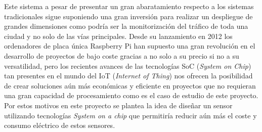 \documentclass[../proyecto.tex]{subfiles}
\begin{document}
Este sistema a pesar de presentar un gran abaratamiento respecto a los sistemas tradicionales sigue suponiendo una gran inversión para realizar un despliegue de grandes dimensiones como podría ser la monitorización del tráfico de toda una ciudad y no solo de las vías principales. Desde su lanzamiento en 2012 los ordenadores de placa única Raspberry Pi han supuesto una gran revolución en el desarrollo de proyectos de bajo coste gracias a no solo a su precio si no a su versatilidad, pero los recientes avances de las tecnologías SoC (\textit{System on Chip}) tan presentes en el mundo del IoT (\textit{Internet of Thing}) nos ofrecen la posibilidad de crear soluciones aún más económicas y eficiente en proyectos que no requieran una gran capacidad de procesamiento como es el caso de estudio de este proyecto. Por estos motivos en este proyecto se plantea la idea de diseñar un sensor utilizando tecnologías \textit{System on a chip} que permitiría reducir aún más el coste y consumo eléctrico de estos sensores.\\
\end{document}
